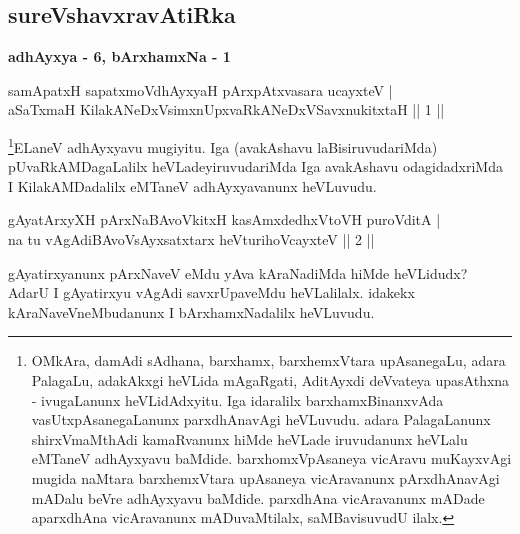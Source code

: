 \begin{center}
\section*{sureVshavxravAtiRka}
{\Large\textbf{adhAyxya - 6,   bArxhamxNa - 1}}
\medskip
\end{center}

\begin{shl}
samApatxH sapatxmoV\s dhAyxyaH pArxpAtxvasara ucayxteV | \\
aSaTxmaH KilakANeDxV\s simxnUpxvaRkANeDxVSavxnukitxtaH \hfill|| 1 || 
\end{shl}

\begin{artha} 
\footnote[1]{OMkAra, damAdi sAdhana, barxhamx, barxhemxVtara 
upAsanegaLu, adara PalagaLu, adakAkxgi heVLida mAgaRgati, AditAyxdi 
deVvateya upasAthxna - ivugaLanunx heVLidAdxyitu. Iga idaralilx 
barxhamxBinanxvAda vasUtxpAsanegaLanunx parxdhAnavAgi heVLuvudu. adara 
PalagaLanunx shirxVmaMthAdi kamaRvanunx hiMde heVLade iruvudanunx heVLalu 
eMTaneV adhAyxyavu baMdide. barxhomxVpAsaneya vicAravu muKayxvAgi 
mugida naMtara barxhemxVtara upAsaneya vicAravanunx pArxdhAnavAgi 
mADalu beVre adhAyxyavu baMdide. parxdhAna vicAravanunx mADade 
aparxdhAna vicAravanunx mADuvaMtilalx, saMBavisuvudU ilalx.}ELaneV adhAyxyavu mugiyitu. Iga (avakAshavu 
laBisiruvudariMda) pUvaRkAMDagaLalilx heVLadeyiruvudariMda Iga 
avakAshavu odagidadxriMda I KilakAMDadalilx eMTaneV adhAyxyavanunx 
heVLuvudu.
\end{artha}


\begin{shl}
gAyatArxyXH pArxNaBAvoVkitxH kasAmxdedhxVtoVH puroVditA | \\
na tu vAgAdiBAvoV\s sAyxsatxtarx heVturihoVcayxteV \hfill|| 2 || 
\end{shl}

\begin{artha} 
gAyatirxyanunx pArxNaveV eMdu yAva kAraNadiMda hiMde heVLidudx? AdarU 
I gAyatirxyu vAgAdi savxrUpaveMdu heVLalilalx. idakekx 
kAraNaveVneMbudanunx \-I bArxhamxNadalilx heVLuvudu.
\end{artha}

